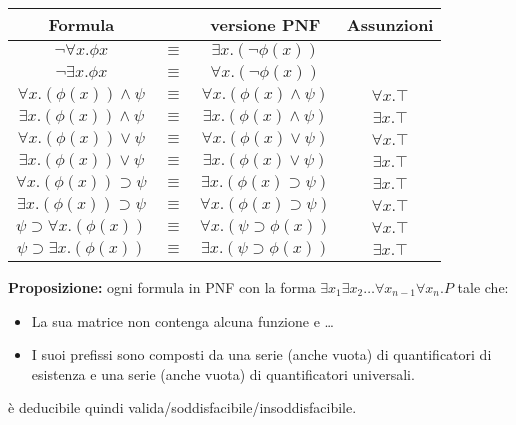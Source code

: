 \documentclass[../main.tex]{subfiles}
\begin{document}
   \begin{center}
      \begin{tabular}{c c c c}
         \textbf{Formula} & & \textbf{versione PNF} & \textbf{Assunzioni}\\
         \hline
         $\lnot \forall x.\phi x$ & $\equiv$ & $\exists x.(\lnot \phi (x))$ & \\
         $\lnot \exists x.\phi x$ & $\equiv$ & $\forall x.(\lnot \phi (x))$ & \\
         $\forall x.(\phi (x)) \land \psi$ & $\equiv$ & $\forall x.(\phi (x) \land \psi)$ & $\forall x.\top$\\
         $\exists x.(\phi (x)) \land \psi$ & $\equiv$ & $\exists x.(\phi (x) \land \psi)$ & $\exists x.\top$\\
         $\forall x.(\phi (x)) \lor \psi$ & $\equiv$ & $\forall x.(\phi (x) \lor \psi)$ & $\forall x.\top$\\
         $\exists x.(\phi (x)) \lor \psi$ & $\equiv$ & $\exists x.(\phi (x) \lor \psi)$ & $\exists x.\top$\\
         $\forall x.(\phi (x)) \supset \psi$ & $\equiv$ & $\exists x.(\phi (x) \supset \psi)$ & $\exists x.\top$\\
         $\exists x.(\phi (x)) \supset \psi$ & $\equiv$ & $\forall x.(\phi (x) \supset \psi)$ & $\forall x.\top$\\
         $\psi \supset \forall x.(\phi (x))$ & $\equiv$ & $\forall x.(\psi \supset \phi (x))$ & $\forall x.\top$\\
         $\psi \supset \exists x.(\phi (x))$ & $\equiv$ & $\exists x.(\psi \supset \phi (x))$ & $\exists x.\top$
      \end{tabular}
   \end{center}
   \vspace{4ex}
   \textbf{Proposizione:} ogni formula in PNF con la forma $\exists x_1 \exists x_2 \dots \forall x_{n-1} \forall x_n .P$ tale che:
   \begin{itemize}
      \item La sua matrice non contenga alcuna funzione e \dots
      \item I suoi prefissi sono composti da una serie (anche vuota) di quantificatori di esistenza e una serie (anche vuota) di quantificatori universali.
   \end{itemize}
   è deducibile quindi valida/soddisfacibile/insoddisfacibile.
\end{document}

